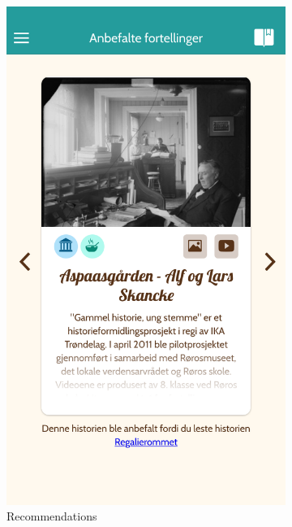 \begin{appendices}
\begin{figure}
	\end{figure}
	\begin{figure}[h]
		\ContinuedFloat
		\centering
		\begin{subfigure}[h]{0.3\textwidth}
			\includegraphics[width=\textwidth]{fig/screenshot_recommendations}
			\caption{Recommendations}
		\end{subfigure}
		\begin{subfigure}[h]{0.3\textwidth}

\end{subfigure}
\end{figure}
\end{appendices}
